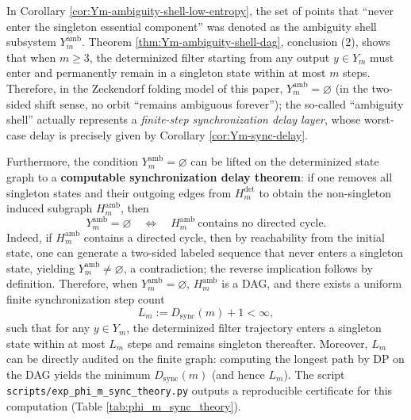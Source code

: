\begin{remark}[Ambiguity Shell as Subsystem Is Empty for \texorpdfstring{$m\ge 3$}{m>=3}]\label{rem:Ym-amb-empty}
In Corollary \ref{cor:Ym-ambiguity-shell-low-entropy}, the set of points that ``never enter the singleton essential component'' was denoted as the ambiguity shell subsystem \(Y_m^{\mathrm{amb}}\).
Theorem \ref{thm:Ym-ambiguity-shell-dag}, conclusion (2), shows that when \(m\ge 3\), the determinized filter starting from any output \(y\in Y_m\) must enter and permanently remain in a singleton state within at most \(m\) steps.
Therefore, in the Zeckendorf folding model of this paper, \(Y_m^{\mathrm{amb}}=\varnothing\) (in the two-sided shift sense, no orbit ``remains ambiguous forever''); the so-called ``ambiguity shell'' actually represents a \emph{finite-step synchronization delay layer}, whose worst-case delay is precisely given by Corollary \ref{cor:Ym-sync-delay}.
\par
Furthermore, the condition \(Y_m^{\mathrm{amb}}=\varnothing\) can be lifted on the determinized state graph to a \textbf{computable synchronization delay theorem}:
if one removes all singleton states and their outgoing edges from $H_m^{\mathrm{det}}$ to obtain the non-singleton induced subgraph $H_m^{\mathrm{amb}}$, then
\[
Y_m^{\mathrm{amb}}=\varnothing
\quad\Longleftrightarrow\quad
H_m^{\mathrm{amb}}\ \text{contains no directed cycle}.
\]
Indeed, if $H_m^{\mathrm{amb}}$ contains a directed cycle, then by reachability from the initial state, one can generate a two-sided labeled sequence that never enters a singleton state, yielding \(Y_m^{\mathrm{amb}}\neq\varnothing\), a contradiction; the reverse implication follows by definition.
Therefore, when \(Y_m^{\mathrm{amb}}=\varnothing\), $H_m^{\mathrm{amb}}$ is a DAG, and there exists a uniform finite synchronization step count
\[
L_m:=D_{\mathrm{sync}}(m)+1<\infty,
\]
such that for any \(y\in Y_m\), the determinized filter trajectory enters a singleton state within at most \(L_m\) steps and remains singleton thereafter. Moreover, $L_m$ can be directly audited on the finite graph: computing the longest path by DP on the DAG yields the minimum \(D_{\mathrm{sync}}(m)\) (and hence \(L_m\)). The script \texttt{scripts/exp\_phi\_m\_sync\_theory.py} outputs a reproducible certificate for this computation (Table \ref{tab:phi_m_sync_theory}).
\end{remark}



